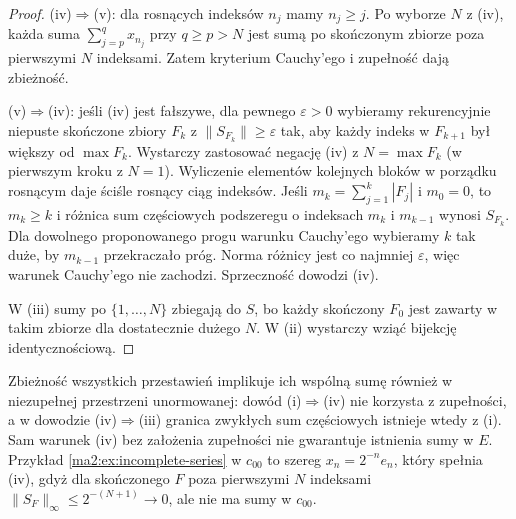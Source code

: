 \begin{proof}
(iv)$\Rightarrow$(v): dla rosnących indeksów $n_j$
mamy $n_j\ge j$. Po wyborze $N$ z (iv), każda suma
$\sum_{j=p}^q x_{n_j}$ przy $q\ge p>N$ jest sumą po
skończonym zbiorze poza pierwszymi $N$ indeksami.
Zatem kryterium Cauchy'ego i zupełność dają zbieżność.

(v)$\Rightarrow$(iv): jeśli (iv) jest fałszywe, dla
pewnego $\varepsilon>0$ wybieramy rekurencyjnie niepuste
skończone zbiory $F_k$ z $\|S_{F_k}\|\ge\varepsilon$
tak, aby każdy indeks w $F_{k+1}$ był większy od
$\max F_k$. Wystarczy zastosować negację (iv) z
$N=\max F_k$ (w pierwszym kroku z $N=1$).
Wyliczenie elementów kolejnych bloków w porządku
rosnącym daje ściśle rosnący ciąg indeksów.
Jeśli $m_k=\sum_{j=1}^k |F_j|$ i $m_0=0$, to $m_k\ge k$
i różnica sum częściowych podszeregu o indeksach
$m_k$ i $m_{k-1}$ wynosi $S_{F_k}$. Dla dowolnego
proponowanego progu warunku Cauchy'ego wybieramy $k$
tak duże, by $m_{k-1}$ przekraczało próg. Norma różnicy
jest co najmniej $\varepsilon$, więc warunek Cauchy'ego
nie zachodzi. Sprzeczność dowodzi (iv).

W (iii) sumy po $\{1,\ldots,N\}$ zbiegają do $S$,
bo każdy skończony $F_0$ jest zawarty w takim zbiorze
dla dostatecznie dużego $N$. W (ii) wystarczy wziąć
bijekcję identycznościową.
\end{proof}

\begin{uwaga}
Zbieżność wszystkich przestawień implikuje ich wspólną
sumę również w niezupełnej przestrzeni unormowanej:
dowód (i)$\Rightarrow$(iv) nie korzysta z zupełności,
a w dowodzie (iv)$\Rightarrow$(iii) granica zwykłych
sum częściowych istnieje wtedy z (i). Sam warunek
(iv) bez założenia zupełności nie gwarantuje istnienia
sumy w $E$. Przykład \ref{ma2:ex:incomplete-series}
w $c_{00}$ to szereg $x_n=2^{-n}e_n$, który spełnia (iv),
gdyż dla skończonego $F$ poza pierwszymi $N$ indeksami
$\|S_F\|_\infty\le 2^{-(N+1)}\to0$, ale nie ma sumy
w $c_{00}$.
\end{uwaga}

